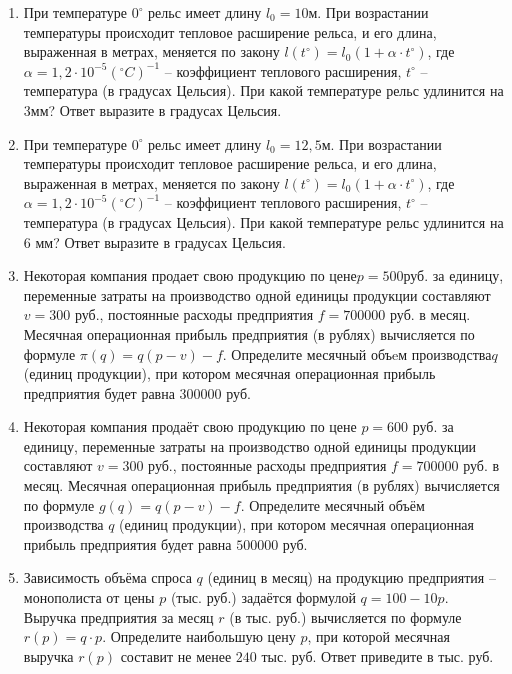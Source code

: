 \documentclass[12pt, a4paper]{article}
\begin{document}
	
	\begin{enumerate}
		\item При температуре \( 0^{\circ}  \) рельс имеет длину \(  l_0=10\)м. При возрастании температуры происходит тепловое расширение рельса, и его длина, выраженная в метрах, меняется по закону \( l(t^{\circ})=l_0(1+\alpha\cdot t^{\circ}) \), где \( \alpha = 1,2\cdot10^{-5}(^{\circ} C)^{-1} \) – коэффициент теплового расширения, \( t^{\circ} \) – температура (в градусах Цельсия). При какой температуре рельс удлинится на \( 3 \)мм? Ответ выразите в градусах Цельсия.
		\item При температуре \( 0^{\circ}  \) рельс имеет длину \( l_0=12,5 \)м. При возрастании температуры происходит тепловое расширение рельса, и его длина, выраженная в метрах, меняется по закону \( l(t^{\circ})=l_0(1+\alpha\cdot t^{\circ}) \), где  \( \alpha=1,2\cdot 10^{-5}(^{\circ}C)^{-1} \) – коэффициент теплового расширения, \( t^{\circ} \) – температура (в градусах Цельсия). При какой температуре рельс удлинится на \( 6 \) мм? Ответ выразите в градусах Цельсия.
		\item Некоторая компания продает свою продукцию по цене\(  p=500  \)руб. за единицу, переменные затраты на производство одной единицы продукции составляют  \( v=300 \) руб., постоянные расходы предприятия \( f=700000 \) руб. в месяц. Месячная операционная прибыль предприятия (в рублях) вычисляется по формуле  \( \pi(q)=q(p-v)-f \). Определите месячный объeм производства\(  q \) (единиц продукции), при котором месячная операционная прибыль предприятия будет равна \( 300000 \) руб.
		\item Некоторая компания продаёт свою продукцию по цене \( p = 600 \) руб. за единицу, переменные затраты на производство одной единицы продукции составляют \( v = 300 \) руб., постоянные расходы предприятия \( f = 700 000 \) руб. в месяц. Месячная операционная прибыль предприятия (в рублях) вычисляется по формуле \(g(q)=q(p-v)-f\). Определите месячный объём производства \( q \) (единиц продукции), при котором месячная операционная прибыль предприятия будет равна \( 500 000 \) руб.
		\item Зависимость объёма спроса \( q \) (единиц в месяц) на продукцию предприятия – монополиста от цены \( p \) (тыс. руб.) задаётся формулой \( q=100-10p \). Выручка предприятия за месяц \( r \) (в тыс. руб.) вычисляется по формуле \( r(p)=q\cdot p \). Определите наибольшую цену \( p \), при которой месячная выручка \( r(p) \) составит не менее \( 240 \) тыс. руб. Ответ приведите в тыс. руб.

\end{enumerate}
\end{document}
